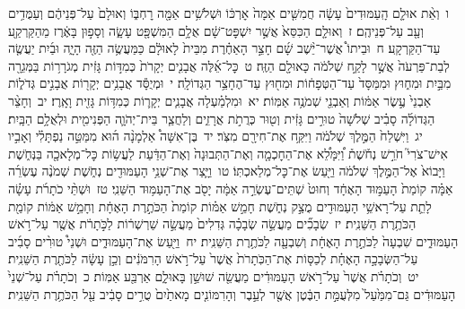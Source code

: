 \documentclass[18pt]{article}
\newcommand{\kri}[1]{\Afootnote{#1}}	%
\begin{document}
 {\loc ו~}וְאֵ֨ת אוּלָ֤ם הָֽעַמּוּדִים֙ עָשָׂ֔ה חֲמִשִּׁ֤ים אַמָּה֙ אׇרְכּ֔וֹ וּשְׁלֹשִׁ֥ים אַמָּ֖ה רׇחְבּ֑וֹ וְאוּלָם֙ עַל־פְּנֵיהֶ֔ם וְעַמֻּדִ֥ים וְעָ֖ב עַל־פְּנֵיהֶֽם׃ \startlock
 {\loc ז~}וְאוּלָ֤ם הַכִּסֵּא֙ אֲשֶׁ֣ר יִשְׁפׇּט־שָׁ֔ם אֻלָ֥ם הַמִּשְׁפָּ֖ט עָשָׂ֑ה וְסָפ֣וּן בָּאֶ֔רֶז מֵהַקַּרְקַ֖ע עַד־הַקַּרְקָֽע׃ \startlock
 {\loc ח~}וּבֵיתוֹ֩ אֲשֶׁר־יֵ֨שֶׁב שָׁ֜ם חָצֵ֣ר הָאַחֶ֗רֶת מִבֵּית֙ לָאוּלָ֔ם כַּמַּעֲשֶׂ֥ה הַזֶּ֖ה הָיָ֑ה וּבַ֜יִת יַעֲשֶׂ֤ה לְבַת־פַּרְעֹה֙ אֲשֶׁ֣ר לָקַ֣ח שְׁלֹמֹ֔ה כָּאוּלָ֖ם הַזֶּֽה׃ \startlock
 {\loc ט~}כׇּל־אֵ֜לֶּה אֲבָנִ֤ים יְקָרֹת֙ כְּמִדּ֣וֹת גָּזִ֔ית מְגֹרָר֥וֹת בַּמְּגֵרָ֖ה מִבַּ֣יִת וּמִח֑וּץ וּמִמַּסָּד֙ עַד־הַטְּפָח֔וֹת וּמִח֖וּץ עַד־הֶחָצֵ֥ר הַגְּדוֹלָֽה׃ \startlock
 {\loc י~}וּמְיֻסָּ֕ד אֲבָנִ֥ים יְקָר֖וֹת אֲבָנִ֣ים גְּדֹל֑וֹת אַבְנֵי֙ עֶ֣שֶׂר אַמּ֔וֹת וְאַבְנֵ֖י שְׁמֹנֶ֥ה אַמּֽוֹת׃ \startlock
 {\loc יא~}וּמִלְמַ֗עְלָה אֲבָנִ֧ים יְקָר֛וֹת כְּמִדּ֥וֹת גָּזִ֖ית וָאָֽרֶז׃ \startlock
 {\loc יב~}וְחָצֵ֨ר הַגְּדוֹלָ֜ה סָבִ֗יב שְׁלֹשָׁה֙ טוּרִ֣ים גָּזִ֔ית וְט֖וּר כְּרֻתֹ֣ת אֲרָזִ֑ים וְלַחֲצַ֧ר בֵּית־יְהֹוָ֛ה הַפְּנִימִ֖ית וּלְאֻלָ֥ם הַבָּֽיִת׃ \startlock
 {\loc יג~}וַיִּשְׁלַח֙ הַמֶּ֣לֶךְ שְׁלֹמֹ֔ה וַיִּקַּ֥ח אֶת־חִירָ֖ם מִצֹּֽר׃ \startlock
 {\loc יד~}בֶּן־אִשָּׁה֩ אַלְמָנָ֨ה ה֜וּא מִמַּטֵּ֣ה נַפְתָּלִ֗י וְאָבִ֣יו אִישׁ־צֹרִי֮ חֹרֵ֣שׁ נְחֹ֒שֶׁת֒ וַ֠יִּמָּלֵ֠א אֶת־הַחׇכְמָ֤ה וְאֶת־הַתְּבוּנָה֙ וְאֶת־הַדַּ֔עַת לַעֲשׂ֥וֹת כׇּל־מְלָאכָ֖ה בַּנְּחֹ֑שֶׁת וַיָּבוֹא֙ אֶל־הַמֶּ֣לֶךְ שְׁלֹמֹ֔ה וַיַּ֖עַשׂ אֶת־כׇּל־מְלַאכְתּֽוֹ׃ \startlock
 {\loc טו~}וַיָּ֛צַר אֶת־שְׁנֵ֥י הָעַמּוּדִ֖ים נְחֹ֑שֶׁת שְׁמֹנֶ֨ה עֶשְׂרֵ֜ה אַמָּ֗ה קוֹמַת֙ הָעַמּ֣וּד הָאֶחָ֔ד וְחוּט֙ שְׁתֵּים־עֶשְׂרֵ֣ה אַמָּ֔ה יָסֹ֖ב אֶת־הָעַמּ֥וּד הַשֵּׁנִֽי׃ \startlock
 {\loc טז~}וּשְׁתֵּ֨י כֹתָרֹ֜ת עָשָׂ֗ה לָתֵ֛ת עַל־רָאשֵׁ֥י הָעַמּוּדִ֖ים מֻצַ֣ק נְחֹ֑שֶׁת חָמֵ֣שׁ אַמּ֗וֹת קוֹמַת֙ הַכֹּתֶ֣רֶת הָאֶחָ֔ת וְחָמֵ֣שׁ אַמּ֔וֹת קוֹמַ֖ת הַכֹּתֶ֥רֶת הַשֵּׁנִֽית׃ \startlock
 {\loc יז~}שְׂבָכִ֞ים מַעֲשֵׂ֣ה שְׂבָכָ֗ה גְּדִלִים֙ מַעֲשֵׂ֣ה שַׁרְשְׁר֔וֹת לַכֹּ֣תָרֹ֔ת אֲשֶׁ֖ר עַל־רֹ֣אשׁ הָעַמּוּדִ֑ים שִׁבְעָה֙ לַכֹּתֶ֣רֶת הָאֶחָ֔ת וְשִׁבְעָ֖ה לַכֹּתֶ֥רֶת הַשֵּׁנִֽית׃ \startlock
 {\loc יח~}וַיַּ֖עַשׂ אֶת־הָעַמּוּדִ֑ים וּשְׁנֵי֩ טוּרִ֨ים סָבִ֜יב עַל־הַשְּׂבָכָ֣ה הָאֶחָ֗ת לְכַסּ֤וֹת אֶת־הַכֹּֽתָרֹת֙ אֲשֶׁר֙ עַל־רֹ֣אשׁ הָרִמֹּנִ֔ים וְכֵ֣ן עָשָׂ֔ה לַכֹּתֶ֖רֶת הַשֵּׁנִֽית׃ \startlock
 {\loc יט~}וְכֹתָרֹ֗ת אֲשֶׁר֙ עַל־רֹ֣אשׁ הָעַמּוּדִ֔ים מַעֲשֵׂ֖ה שׁוּשַׁ֣ן בָּאוּלָ֑ם אַרְבַּ֖ע אַמּֽוֹת׃ \startlock
 {\loc כ~}וְכֹתָרֹ֗ת עַל־שְׁנֵי֙ הָעַמּוּדִ֔ים גַּם־מִמַּ֙עַל֙ מִלְּעֻמַּ֣ת הַבֶּ֔טֶן אֲשֶׁ֖ר לְעֵ֣בֶר  \edtext{(שבכה)}{\kri{קרי: הַשְּׂבָכָ֑ה}}  וְהָרִמּוֹנִ֤ים מָאתַ֙יִם֙ טֻרִ֣ים סָבִ֔יב עַ֖ל הַכֹּתֶ֥רֶת הַשֵּׁנִֽית׃ \startlock
\end{document}
